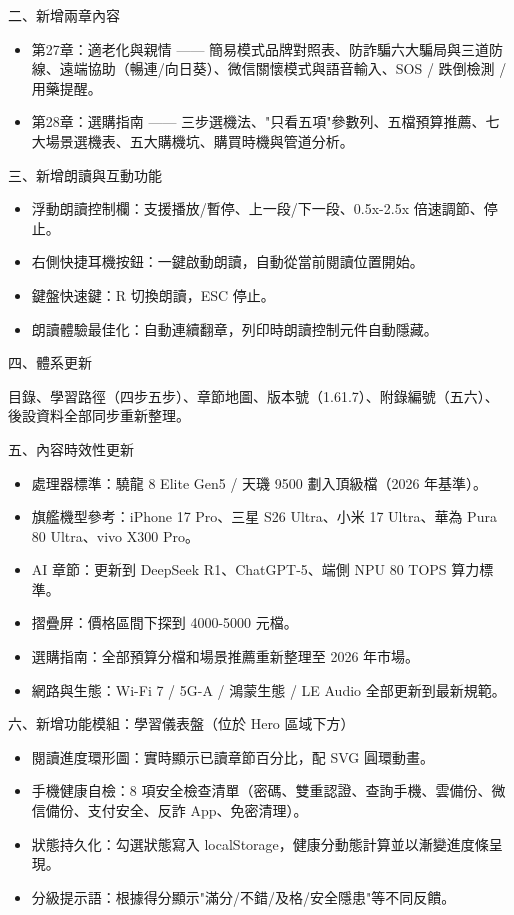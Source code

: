 二、新增兩章內容

\begin{itemize}
  \item 第27章：適老化與親情 —— 簡易模式品牌對照表、防詐騙六大騙局與三道防線、遠端協助（暢連/向日葵）、微信關懷模式與語音輸入、SOS / 跌倒檢測 / 用藥提醒。
  \item 第28章：選購指南 —— 三步選機法、"只看五項"參數列、五檔預算推薦、七大場景選機表、五大購機坑、購買時機與管道分析。
\end{itemize}

三、新增朗讀與互動功能

\begin{itemize}
  \item 浮動朗讀控制欄：支援播放/暫停、上一段/下一段、0.5x-2.5x 倍速調節、停止。
  \item 右側快捷耳機按鈕：一鍵啟動朗讀，自動從當前閱讀位置開始。
  \item 鍵盤快速鍵：R 切換朗讀，ESC 停止。
  \item 朗讀體驗最佳化：自動連續翻章，列印時朗讀控制元件自動隱藏。
\end{itemize}

四、體系更新

目錄、學習路徑（四步五步）、章節地圖、版本號（1.61.7）、附錄編號（五六）、後設資料全部同步重新整理。

五、內容時效性更新

\begin{itemize}
  \item 處理器標準：驍龍 8 Elite Gen5 / 天璣 9500 劃入頂級檔（2026 年基準）。
  \item 旗艦機型參考：iPhone 17 Pro、三星 S26 Ultra、小米 17 Ultra、華為 Pura 80 Ultra、vivo X300 Pro。
  \item AI 章節：更新到 DeepSeek R1、ChatGPT-5、端側 NPU 80 TOPS 算力標準。
  \item 摺疊屏：價格區間下探到 4000-5000 元檔。
  \item 選購指南：全部預算分檔和場景推薦重新整理至 2026 年市場。
  \item 網路與生態：Wi-Fi 7 / 5G-A / 鴻蒙生態 / LE Audio 全部更新到最新規範。
\end{itemize}

六、新增功能模組：學習儀表盤（位於 Hero 區域下方）

\begin{itemize}
  \item 閱讀進度環形圖：實時顯示已讀章節百分比，配 SVG 圓環動畫。
  \item 手機健康自檢：8 項安全檢查清單（密碼、雙重認證、查詢手機、雲備份、微信備份、支付安全、反詐 App、免密清理）。
  \item 狀態持久化：勾選狀態寫入 localStorage，健康分動態計算並以漸變進度條呈現。
  \item 分級提示語：根據得分顯示"滿分/不錯/及格/安全隱患"等不同反饋。
\end{itemize}

